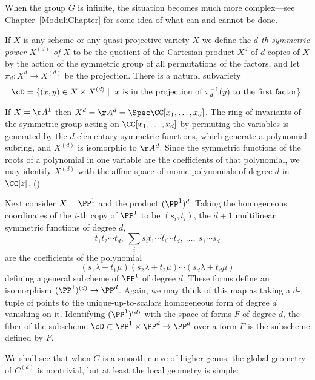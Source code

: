 When the group $G$ is infinite, the situation becomes much more complex---see Chapter~\ref{ModuliChapter} for some  idea of what can and cannot be done.

If $X$ is any scheme or any quasi-projective variety $X$ we define the \emph{$d$-th symmetric power $X^{(d)}$ of $X$} to be the quotient of the Cartesian product $X^d$ of $d$ copies of $X$ by the action of the symmetric group of all permutations of the factors, and let $\pi_d: X^d\to X^{(d)}$ be the projection. There is a natural
subvariety 
$$
\cD = \{(x,y) \in X \times X^{(d)}\mid \hbox{ $x$ is in the projection of $\pi_d^{-1}(y)$ to the first factor}\}.
$$



If $X=\AA^{1}$ then $X^{d} = \AA^{d} = \Spec \CC[x_{1}, \dots, x_{d}]$. The ring of invariants of the symmetric group acting on
$\CC[x_{1}, \dots, x_{d}]$ by permuting the variables is generated by the $d$ elementary symmetric functions, which generate a polynomial subring, and $X^{(d)}$ is isomorphic to $\AA^{d}$. Since the symmetric functions of the roots of a polynomial in one variable are the coefficients of
that polynomial, we may identify $X^{(d)}$ with the affine space of monic polynomials of degree $d$ in $\CC[z]$. (\cite[Exercises 1.6, 13.2-13.4]{Eisenbud1995})

Next consider $X = \PP^1$ and the product $(\PP^1)^d$. Taking the homogeneous coordinates of the
$i$-th copy of $\PP^1$ to be $(s_i,t_i)$, the $d+1$ multilinear symmetric functions of degree $d$,
$$
t_1t_2\cdots t_d,\ \sum_i s_it_1\cdots\hat t_i\cdots t_d,\ \dots,\ s_1\cdots s_d
$$
are the coefficients of the polynomial
$$
(s_1\lambda + t_1\mu)(s_2\lambda + t_2\mu)\cdots(s_d\lambda + t_d\mu)
$$
defining a general subcheme of $\PP^1$ of degree $d$. These forms  define
an isomorphism $(\PP^1)^{(d)} \to \PP^d$. 
Again, we may think of this map as taking a $d$-tuple of points to the unique-up-to-scalars
homogeneous form of degree $d$ vanishing on it.
Identifying $(\PP^1)^{(d)}$ with the space of forms
$F$ of degree $d$, the fiber of the subscheme $\cD\subset \PP^1 \times \PP^d \to \PP^d$
over a form $F$ is the subscheme defined by $F$.

We shall see that when $C$ is a smooth curve of higher genus, the global geometry of $C^{(d)}$ is nontrivial, but at least the local geometry is simple:

